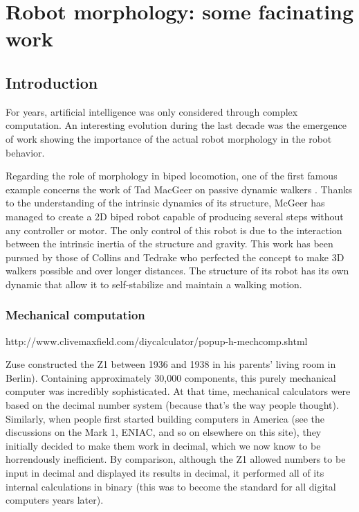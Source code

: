 

\chapter{Robot morphology: some facinating work} %


\section{Introduction} %
For years, artificial intelligence was only considered through complex computation. An interesting evolution during the last decade was the emergence of work showing the importance of the actual robot morphology in the robot behavior.

Regarding the role of morphology in biped locomotion, one of the first famous example concerns the work of Tad MacGeer on passive dynamic walkers \cite{mcgeer1990passive}. Thanks to the understanding of the intrinsic dynamics of its structure, McGeer has managed to create a 2D biped robot capable of producing several steps without any controller or motor. The only control of this robot is due to the interaction between the intrinsic inertia of the structure and gravity. This work has been pursued by those of Collins \cite{collins2001three} and Tedrake \cite{Tedrake2004}  who perfected the concept to make 3D walkers possible and over longer distances. The structure of its robot has its own dynamic that allow it to self-stabilize and maintain a walking motion.

\subsection{Mechanical computation} %

http://www.clivemaxfield.com/diycalculator/popup-h-mechcomp.shtml

Zuse constructed the Z1 between 1936 and 1938 in his parents' living room in Berlin). Containing approximately 30,000 components, this purely mechanical computer was incredibly sophisticated. At that time, mechanical calculators were based on the decimal number system (because that’s the way people thought). Similarly, when people first started building computers in America (see the discussions on the Mark 1, ENIAC, and so on elsewhere on this site), they initially decided to make them work in decimal, which we now know to be horrendously inefficient. By comparison, although the Z1 allowed numbers to be input in decimal and displayed its results in decimal, it performed all of its internal calculations in binary (this was to become the standard for all digital computers years later).

